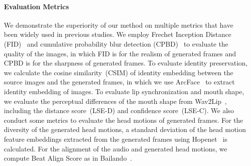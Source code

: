 \paragraph{Evaluation Metrics} We demonstrate the superiority of our method on multiple metrics that have been widely used in previous studies. We employ Frechet Inception Distance (FID)~\cite{fid,fidpaper} and cumulative probability blur detection (CPBD)~\cite{cpbd} to evaluate the quality of the images, in which FID is for the realism of generated frames and CPBD is for the sharpness of generated frames. To evaluate identity preservation, we calculate the cosine similarity~(CSIM) of identity embedding between the source images and the generated frames, in which we use ArcFace~\cite{arcface} to extract identity embedding of images. 
To evaluate lip synchronization and mouth shape, 
we evaluate the perceptual differences of the mouth shape from Wav2Lip~\cite{wav2lip}, including the distance score~(LSE-D) and confidence score~(LSE-C). We also conduct some metrics to evaluate the head motions of generated frames. For the diversity of the generated head motions, a standard deviation of the head motion feature embeddings extracted from the generated frames using Hopenet~\cite{hopenet} is calculated. For the alignment of the audio and generated head motions, we compute Beat Align Score as in Bailando~\cite{bailando}. 






